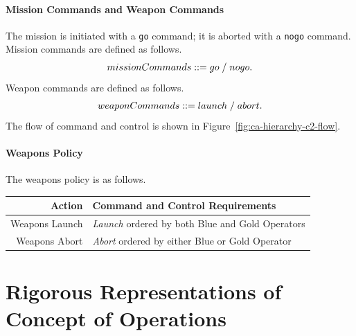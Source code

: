 \documentclass[10pt,twoside]{article}
\begin{document}
\paragraph{Mission Commands and Weapon Commands}
The mission is initiated with a \texttt{go} command; it is aborted
with a \texttt{nogo} command. Mission commands are defined as follows.
\begin{gather*}
  missionCommands \; {:}{:}{=} \; go \;/\; nogo.
\end{gather*}
Weapon commands are defined as follows.
\begin{gather*}
  weaponCommands \; {:}{:}{=} \; launch \;/\; abort.
\end{gather*}
The flow of command and control is shown in Figure~\ref{fig:ca-hierarchy-c2-flow}.

\paragraph{Weapons Policy}

The weapons policy is as follows.
\begin{center}
  \begin{tabular}[h]{|r|l|}
    \hline
    \textbf{Action} & \textbf{Command and Control Requirements}\\
    \hline
    Weapons Launch & \emph{Launch} ordered by both Blue and Gold Operators\\
    Weapons Abort & \emph{Abort} ordered by either Blue or Gold Operator\\
    \hline
  \end{tabular}
\end{center}


\section{Rigorous Representations of Concept of Operations}
\end{document}
